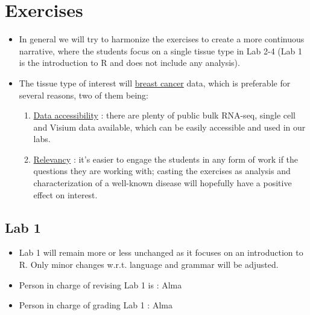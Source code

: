 \documentclass[11pt]{article}
\begin{document}
\section{Exercises}
\label{sec:org88cab44}

\begin{itemize}
\item In general we will try to harmonize the exercises to create a more
continuous narrative, where the students focus on a single tissue type in
Lab 2-4 (Lab 1 is the introduction to R and does not include any analysis).

\item The tissue type of interest will \uline{breast cancer} data, which is preferable
for several reasons, two of them being:

\begin{enumerate}
\item \uline{Data accessibility} : there are plenty of public bulk RNA-seq, single cell
and Visium data available, which can be easily accessible and used in our labs.
\item \uline{Relevancy} : it's easier to engage the students in any form of work if
the questions they are working with; casting the exercises as analysis
and characterization of a well-known disease will hopefully have a
positive effect on interest.
\end{enumerate}
\end{itemize}

\subsection{Lab 1}
\label{sec:org35b6022}
\begin{itemize}
\item Lab 1 will remain more or less unchanged as it focuses on an introduction to
R. Only minor changes w.r.t. language and grammar will be adjusted.
\item Person in charge of revising Lab 1 is : Alma
\item Person in charge of grading Lab 1 : Alma
\end{itemize}
\end{document}

